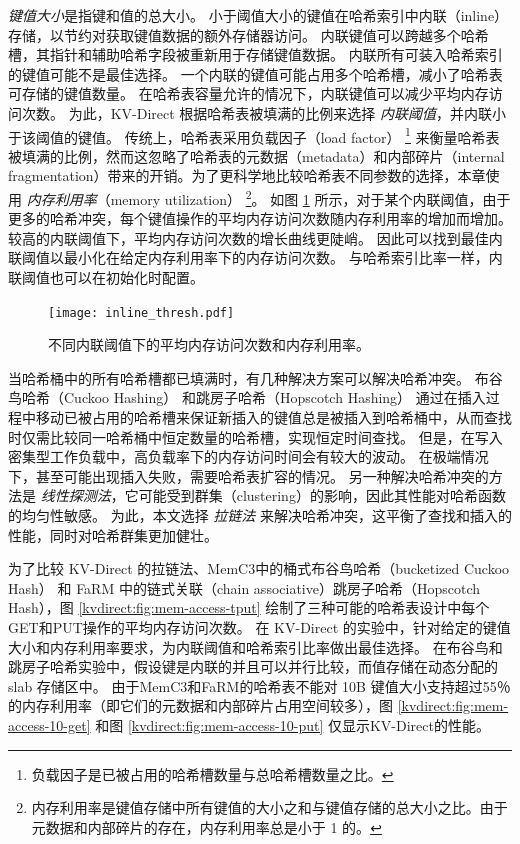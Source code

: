 \textit {键值大小}是指键和值的总大小。
小于阈值大小的键值在哈希索引中内联（inline）存储，以节约对获取键值数据的额外存储器访问。
内联键值可以跨越多个哈希槽，其指针和辅助哈希字段被重新用于存储键值数据。
内联所有可装入哈希索引的键值可能不是最佳选择。
一个内联的键值可能占用多个哈希槽，减小了哈希表可存储的键值数量。
在哈希表容量允许的情况下，内联键值可以减少平均内存访问次数。
为此，KV-Direct 根据哈希表被填满的比例来选择 \textit {内联阈值}，并内联小于该阈值的键值。
传统上，哈希表采用负载因子（load factor） \footnote{负载因子是已被占用的哈希槽数量与总哈希槽数量之比。} 来衡量哈希表被填满的比例，然而这忽略了哈希表的元数据（metadata）和内部碎片（internal fragmentation）带来的开销。为了更科学地比较哈希表不同参数的选择，本章使用 \textit {内存利用率}（memory utilization） \footnote{内存利用率是键值存储中所有键值的大小之和与键值存储的总大小之比。由于元数据和内部碎片的存在，内存利用率总是小于 1 的。}。
如图 \ref {kvdirect:fig:inline-offline} 所示，对于某个内联阈值，由于更多的哈希冲突，每个键值操作的平均内存访问次数随内存利用率的增加而增加。
较高的内联阈值下，平均内存访问次数的增长曲线更陡峭。
因此可以找到最佳内联阈值以最小化在给定内存利用率下的内存访问次数。
与哈希索引比率一样，内联阈值也可以在初始化时配置。


\begin{figure}[htbp]
	\centering
	\texttt{[image: inline\_thresh.pdf]}
	\caption{不同内联阈值下的平均内存访问次数和内存利用率。}
	\label{kvdirect:fig:inline-offline}
\end{figure}


当哈希桶中的所有哈希槽都已填满时，有几种解决方案可以解决哈希冲突。
布谷鸟哈希（Cuckoo Hashing）\cite {pagh2004cuckoo} 和跳房子哈希（Hopscotch Hashing）\cite {herlihy2008hopscotch} 通过在插入过程中移动已被占用的哈希槽来保证新插入的键值总是被插入到哈希桶中，从而查找时仅需比较同一哈希桶中恒定数量的哈希槽，实现恒定时间查找。
但是，在写入密集型工作负载中，高负载率下的内存访问时间会有较大的波动。
在极端情况下，甚至可能出现插入失败，需要哈希表扩容的情况。
另一种解决哈希冲突的方法是 \textit{线性探测法}，它可能受到群集（clustering）的影响，因此其性能对哈希函数的均匀性敏感。
为此，本文选择 \textit {拉链法} 来解决哈希冲突，这平衡了查找和插入的性能，同时对哈希群集更加健壮。

为了比较 KV-Direct 的拉链法、MemC3中的桶式布谷鸟哈希（bucketized Cuckoo Hash）\cite {fan2013memc3} 和 FaRM \cite {dragojevic2014farm} 中的链式关联（chain associative）跳房子哈希（Hopscotch Hash），图 \ref {kvdirect:fig:mem-access-tput} 绘制了三种可能的哈希表设计中每个GET和PUT操作的平均内存访问次数。
在 KV-Direct 的实验中，针对给定的键值大小和内存利用率要求，为内联阈值和哈希索引比率做出最佳选择。
在布谷鸟和跳房子哈希实验中，假设键是内联的并且可以并行比较，而值存储在动态分配的 slab 存储区中。
由于MemC3和FaRM的哈希表不能对 10B 键值大小支持超过55％的内存利用率（即它们的元数据和内部碎片占用空间较多），图 \ref {kvdirect:fig:mem-access-10-get} 和图 \ref {kvdirect:fig:mem-access-10-put} 仅显示KV-Direct的性能。




